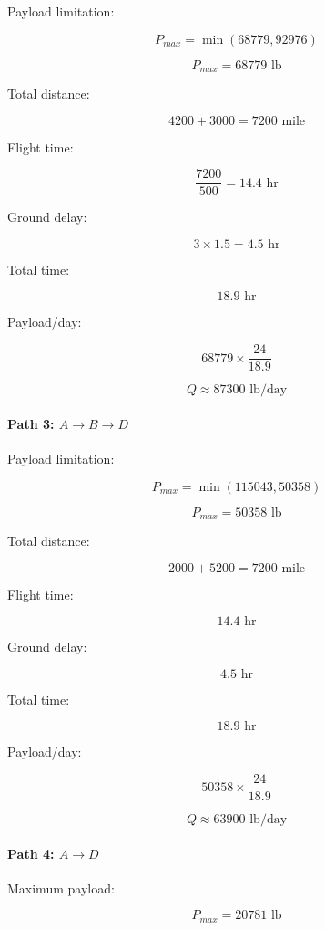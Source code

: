 \documentclass{KPS_assignment}
\begin{document}
Payload limitation:

\[
P_{max}=
\min(68779,92976)
\]

\[
P_{max}=68779 \text{ lb}
\]

Total distance:

\[
4200+3000=7200 \text{ mile}
\]

Flight time:

\[
\frac{7200}{500}=14.4 \text{ hr}
\]

Ground delay:

\[
3\times1.5=4.5 \text{ hr}
\]

Total time:

\[
18.9 \text{ hr}
\]

Payload/day:

\[
68779\times\frac{24}{18.9}
\]

\[
\boxed{
Q\approx87300 \text{ lb/day}
}
\]


\paragraph{Path 3: \(A\rightarrow B\rightarrow D\)}

Payload limitation:

\[
P_{max}=
\min(115043,50358)
\]

\[
P_{max}=50358 \text{ lb}
\]

Total distance:

\[
2000+5200=7200 \text{ mile}
\]

Flight time:

\[
14.4 \text{ hr}
\]

Ground delay:

\[
4.5 \text{ hr}
\]

Total time:

\[
18.9 \text{ hr}
\]

Payload/day:

\[
50358\times\frac{24}{18.9}
\]

\[
\boxed{
Q\approx63900 \text{ lb/day}
}
\]


\paragraph{Path 4: \(A\rightarrow D\)}

Maximum payload:

\[
P_{max}=20781 \text{ lb}
\]
\end{document}

